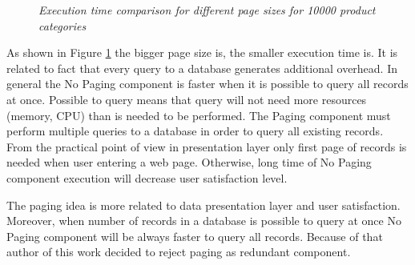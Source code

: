 \documentclass[12pt,a4paper]{article}
\begin{document}
\begin{figure}[!htb]
\centering
{}

\caption{\textit{Execution time comparison for different page sizes for 10000 product categories}} \label{fig:pagesizetime}

\end{figure}

As shown in Figure \ref{fig:pagesizetime} the bigger page size is, the smaller execution time is. It is related to fact that every query to a database generates additional overhead. 
In general the No Paging component is faster when it is possible to query all records at once. Possible to query means that query will not need more resources (memory, CPU) than is needed to be performed. 
The Paging component must perform multiple queries to a database in order to query all existing records. From the practical point of view in presentation layer only first page of records is needed when user entering a web page. Otherwise, long time of No Paging component execution will decrease user satisfaction level.  

The paging idea is more related to data presentation layer and user satisfaction. Moreover, when number of records in a database is possible to query at once No Paging component will be always faster to query all records. Because of that author of this work decided to reject paging as redundant component. 
\end{document}
